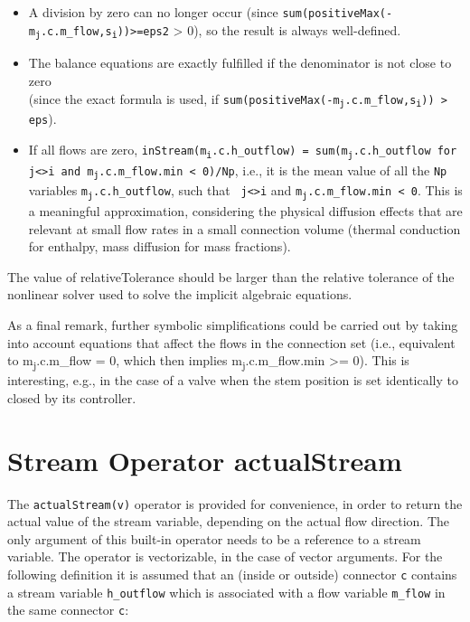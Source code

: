 \begin{nonnormative}
\begin{itemize}
\item
  A division by zero can no longer occur (since \texttt{sum(positiveMax(-m\textsubscript{j}.c.m\_flow,s\textsubscript{i}))\textgreater{}=eps2}
  \textgreater{} 0), so the result is always well-defined.
\item
  The balance equations are exactly fulfilled if the denominator
  is not close to zero\\
  (since the exact formula is used, if
  \texttt{sum(positiveMax(-m\textsubscript{j}.c.m\_flow,s\textsubscript{i})) \textgreater{} eps}).
\item
  If all flows are zero,
  \texttt{inStream(m\textsubscript{i}.c.h\_outflow) =
  sum(m\textsubscript{j}.c.h\_outflow for
  j\textless{}\textgreater{}i and m\textsubscript{j}.c.m\_flow.min \textless{}
  0)/Np}, i.e., it is the mean value of all the \lstinline!Np! variables
  \texttt{m\textsubscript{j}.c.h\_outflow}, such that \texttt{
  j\textless{}\textgreater{}i} and
  \texttt{m\textsubscript{j}.c.m\_flow.min \textless{} 0}. This is a
  meaningful approximation, considering the physical diffusion effects
  that are relevant at small flow rates in a small connection volume
  (thermal conduction for enthalpy, mass diffusion for mass fractions).
\end{itemize}

The value of relativeTolerance should be larger than the relative
tolerance of the nonlinear solver used to solve the implicit algebraic
equations.

As a final remark, further symbolic simplifications could be
carried out by taking into account equations that affect the flows in
the connection set (i.e., equivalent to m\textsubscript{j}.c.m\_flow =
0, which then implies m\textsubscript{j}.c.m\_flow.min \textgreater{}=
0). This is interesting, e.g., in the case of a valve when the stem
position is set identically to closed by its controller.
\end{nonnormative}

\section{Stream Operator actualStream}

The \lstinline!actualStream(v)! operator is provided for convenience, in
order to return the actual value of the stream variable, depending on
the actual flow direction. The only argument of this built-in operator
needs to be a reference to a stream variable. The operator is
vectorizable, in the case of vector arguments. For the following
definition it is assumed that an (inside or outside) connector \lstinline!c!
contains a stream variable \lstinline!h_outflow! which is associated with a flow
variable \lstinline!m_flow! in the same connector \lstinline!c!:

